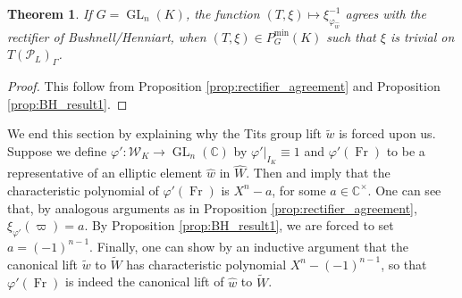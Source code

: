 \documentclass[11pt]{amsart}
\theoremstyle{plain}
\newtheorem{theorem}{Theorem}[section]
\theoremstyle{definition}
\DeclareMathOperator{\Fr}{Fr}
\DeclareMathOperator{\GL}{GL}
\newcommand{\CC}{\mathbb{C}}
\newcommand{\CCx}{\mathbb{C}^\times}
\newcommand{\PL}{\mathcal{P}_L}
\newcommand{\Weil}{\mathcal{W}}
\newcommand{\Pmin}{P_G^{\min}}
\begin{document}
\begin{theorem} \label{thm:bh_agreement}
  If $G = \GL_{n}(K)$, the function $(T,\xi) \mapsto \xi_{\varphi_{\hat{w}}}^{-1}$ agrees with
  the rectifier of Bushnell/Henniart, when $(T,\xi) \in \Pmin(K)$ such that $\xi$ is trivial
  on $T(\PL)_{\Gamma}$.
\end{theorem}

\begin{proof}
This follow from Proposition \ref{prop:rectifier_agreement} and Proposition \ref{prop:BH_result1}.
\end{proof}

We end this section by explaining why the Tits group lift $\tilde{w}$ is forced upon us.
Suppose we define
$\varphi' : \Weil_K \rightarrow \GL_{n}(\CC)$ by $\varphi'|_{I_K} \equiv 1$ and
$\varphi'(\Fr)$ to be a representative of an elliptic element $\hat{w}$ in $\hat{W}$.
Then \cite[p. 824]{reeder-debacker:09a} and \cite[\S6]{reeder:08a} imply that the characteristic
polynomial of $\varphi'(\Fr)$ is $X^n - a$, for some $a \in \CCx$.  One can see that,
by analogous arguments as in Proposition \ref{prop:rectifier_agreement},
$\xi_{\varphi'}(\varpi) = a$.  By Proposition \ref{prop:BH_result1}, we are
forced to set $a = (-1)^{n-1}$.  Finally, one can show by an inductive argument that the
canonical lift $\tilde{w}$ to $\widetilde{W}$ has characteristic polynomial $X^n - (-1)^{n-1}$,
so that $\varphi'(\Fr)$ is indeed the canonical lift of $\hat{w}$ to $\widetilde{W}$.



\end{document}
